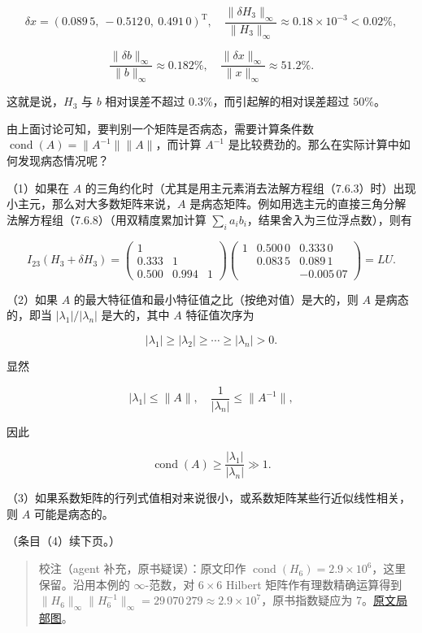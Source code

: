 \documentclass[
  10pt,
  fontset=fandol]{ctexart}
\begin{document}
\[
\delta x=(0.089\,5,\ -0.512\,0,\ 0.491\,0)^{\mathrm T},\quad
\frac{\|\delta H_3\|_\infty}{\|H_3\|_\infty}\approx0.18\times10^{-3}<0.02\%,
\]

\[
\frac{\|\delta b\|_\infty}{\|b\|_\infty}\approx0.182\%,\quad
\frac{\|\delta x\|_\infty}{\|x\|_\infty}\approx51.2\%.
\]

这就是说，\(H_3\) 与 \(b\) 相对误差不超过 \(0.3\%\)，而引起解的相对误差超过 \(50\%\)。

由上面讨论可知，要判别一个矩阵是否病态，需要计算条件数 \(\operatorname{cond}(A)=\|A^{-1}\|\|A\|\)，而计算 \(A^{-1}\) 是比较费劲的。那么在实际计算中如何发现病态情况呢？

（1）如果在 \(A\) 的三角约化时（尤其是用主元素消去法解方程组（7.6.3）时）出现小主元，那么对大多数矩阵来说，\(A\) 是病态矩阵。例如用选主元的直接三角分解法解方程组（7.6.8）（用双精度累加计算 \(\sum_i a_ib_i\)，结果舍入为三位浮点数），则有

\[
I_{23}(H_3+\delta H_3)
=\begin{pmatrix}
1&&\\
0.333&1&\\
0.500&0.994&1
\end{pmatrix}
\begin{pmatrix}
1&0.500\,0&0.333\,0\\
&0.083\,5&0.089\,1\\
&&\boxed{-0.005\,07}
\end{pmatrix}
=LU.
\]

（2）如果 \(A\) 的最大特征值和最小特征值之比（按绝对值）是大的，则 \(A\) 是病态的，即当 \(|\lambda_1|/|\lambda_n|\) 是大的，其中 \(A\) 特征值次序为

\[
|\lambda_1|\geqslant|\lambda_2|\geqslant\cdots\geqslant|\lambda_n|>0.
\]

显然

\[
|\lambda_1|\leqslant\|A\|,\quad\frac1{|\lambda_n|}\leqslant\|A^{-1}\|,
\]

因此

\[
\operatorname{cond}(A)\geqslant\frac{|\lambda_1|}{|\lambda_n|}\gg1.
\]

（3）如果系数矩阵的行列式值相对来说很小，或系数矩阵某些行近似线性相关，则 \(A\) 可能是病态的。

（条目（4）续下页。）

\begin{quote}
校注（agent 补充，原书疑误）：原文印作 \(\operatorname{cond}(H_6)=2.9\times10^6\)，这里保留。沿用本例的 \(\infty\)-范数，对 \(6\times6\) Hilbert 矩阵作有理数精确运算得到 \(\|H_6\|_\infty\|H_6^{-1}\|_\infty=29\,070\,279\approx2.9\times10^7\)，原书指数疑应为 7。\href{../assets/ch07b/208-h6-cond.png}{原文局部图}。
\end{quote}
\end{document}
